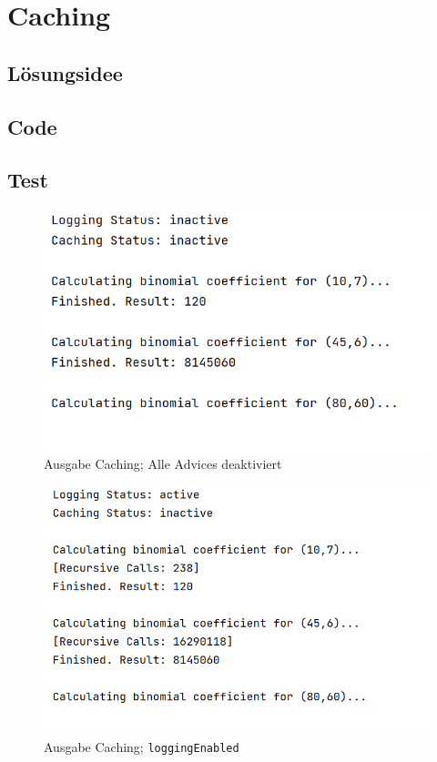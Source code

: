 \documentclass[german,notitlepage,smartquotes]{hgbreport}
\begin{document}

\clearpage

\section{Caching}

\subsection{Lösungsidee}

\subsection{Code}







\subsection{Test}

\begin{figure}[h]
\centering
\includegraphics[width=.5\textwidth]{caching-test-00}
\caption{Ausgabe Caching; Alle Advices deaktiviert}
\label{caching-test-00}
\end{figure}

\begin{figure}[h]
\centering
\includegraphics[width=.5\textwidth]{caching-test-01}
\caption{Ausgabe Caching; \texttt{loggingEnabled}}
\label{caching-test-01}
\end{figure}
\end{document}
